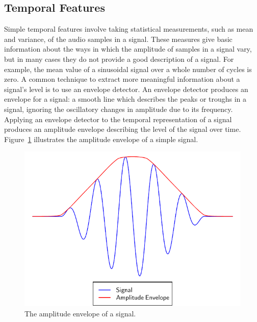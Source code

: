 	\subsection{Temporal Features}
	\label{sec:Timbre-LowLevelFeatures-Temporal}
		Simple temporal features involve taking statistical measurements, such as mean and variance, of the audio
		samples in a signal. These measures give basic information about the ways in which the amplitude of samples
		in a signal vary, but in many cases they do not provide a good description of a signal. For example, the
		mean value of a sinusoidal signal over a whole number of cycles is zero. A common technique to extract more
		meaningful information about a signal's level is to use an envelope detector. An envelope detector produces
		an envelope for a signal: a smooth line which describes the peaks or troughs in a signal, ignoring the
		oscillatory changes in amplitude due to its frequency. Applying an envelope detector to the temporal
		representation of a signal produces an amplitude envelope describing the level of the signal over time.
		Figure~\ref{fig:AmplitudeEnvelope} illustrates the amplitude envelope of a simple signal.

		\begin{figure}[h!]
			\centering
			\includegraphics{chapter2/Images/AmplitudeEnvelope.pdf}
			\caption{The amplitude envelope of a signal.}
			\label{fig:AmplitudeEnvelope}
		\end{figure}

